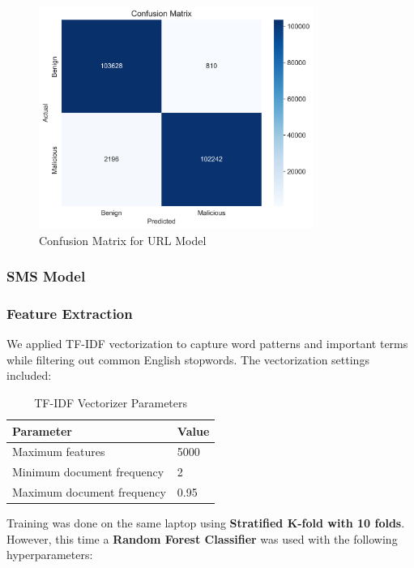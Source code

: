 \documentclass{article}
\begin{document}
\begin{figure}[htbp]
    \centering
    \includegraphics[width=0.8\textwidth]{../analysis/url/confusion_matrix.png}
    \caption{Confusion Matrix for URL Model}
    \label{fig:confusion_matrix_1}
\end{figure}

\subsubsection{SMS Model}
\subsubsection*{Feature Extraction}

We applied TF-IDF vectorization to capture word patterns and important terms while filtering out common English stopwords. The vectorization settings included:

\begin{table}[H]
\renewcommand{\arraystretch}{1.3}
\setlength{\tabcolsep}{11pt}
\centering
\begin{tabular}{|p{6cm}|p{8.5cm}|}
\hline
\textbf{Parameter} & \textbf{Value} \\
\hline
Maximum features & 5000 \\
\hline
Minimum document frequency & 2 \\
\hline
Maximum document frequency & 0.95 \\
\hline
\end{tabular}
\caption{TF-IDF Vectorizer Parameters}
\label{tab:tfidf_params}
\end{table}

\noindent
Training was done on the same laptop using \textbf{Stratified K-fold with 10 folds}. However, this time a \textbf{Random Forest Classifier} was used with the following hyperparameters:
\end{document}

